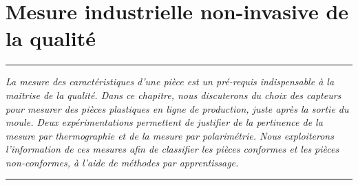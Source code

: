 
\lhead[\fancyplain{}{\leftmark}]%
      {\fancyplain{}{}} %
\chead[\fancyplain{}{}]%
      {\fancyplain{}{}}
\rhead[\fancyplain{}{}]%
      {\fancyplain{}{\rightmark}}%
\lfoot[\fancyplain{}{}]%
      {\fancyplain{}{}}
\cfoot[\fancyplain{}{\thepage}]%
      {\fancyplain{}{\thepage}} %
\rfoot[\fancyplain{}{}]%
     {\fancyplain{}{\scriptsize}}



\chapter{Mesure industrielle non-invasive de la qualité}
\label{ch:measure}


\begin{center}
\rule{0.7\linewidth}{.5pt}
\begin{minipage}{0.7\linewidth}
\smallskip

\textit{
	La mesure des caractéristiques d'une pièce est un pré-requis indispensable à la maîtrise de la qualité.
	Dans ce chapitre, nous discuterons du choix des capteurs pour mesurer des pièces plastiques en ligne de production, juste après la sortie du moule.
	Deux expérimentations permettent de justifier de la pertinence de la mesure par thermographie et de la mesure par polarimétrie.
	Nous exploiterons l'information de ces mesures afin de classifier les pièces conformes et les pièces non-conformes, à l'aide de méthodes par apprentissage.}

\end{minipage}
\smallskip
\rule{0.7\linewidth}{.5pt}
\end{center}

\minitoc
\newpage


